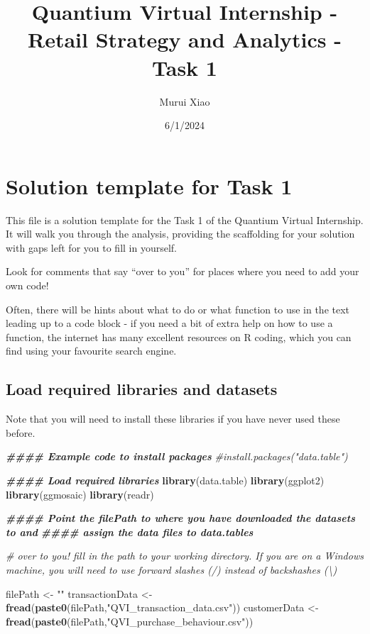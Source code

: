 \documentclass[
]{article}
\title{Quantium Virtual Internship - Retail Strategy and Analytics -
Task 1}
\author{Murui Xiao}
\date{6/1/2024}
\newenvironment{Shaded}{\begin{snugshade}}{\end{snugshade}}
\newcommand{\CommentTok}[1]{\textcolor[rgb]{0.56,0.35,0.01}{\textit{#1}}}
\newcommand{\DocumentationTok}[1]{\textcolor[rgb]{0.56,0.35,0.01}{\textbf{\textit{#1}}}}
\newcommand{\FunctionTok}[1]{\textcolor[rgb]{0.13,0.29,0.53}{\textbf{#1}}}
\newcommand{\NormalTok}[1]{#1}
\newcommand{\OtherTok}[1]{\textcolor[rgb]{0.56,0.35,0.01}{#1}}
\newcommand{\StringTok}[1]{\textcolor[rgb]{0.31,0.60,0.02}{#1}}
\begin{document}
\maketitle

\section{Solution template for Task
1}\label{solution-template-for-task-1}

This file is a solution template for the Task 1 of the Quantium Virtual
Internship. It will walk you through the analysis, providing the
scaffolding for your solution with gaps left for you to fill in
yourself.

Look for comments that say ``over to you'' for places where you need to
add your own code!

Often, there will be hints about what to do or what function to use in
the text leading up to a code block - if you need a bit of extra help on
how to use a function, the internet has many excellent resources on R
coding, which you can find using your favourite search engine.

\subsection{Load required libraries and
datasets}\label{load-required-libraries-and-datasets}

Note that you will need to install these libraries if you have never
used these before.

\begin{Shaded}
\begin{Highlighting}[]
\DocumentationTok{\#\#\#\# Example code to install packages}
\CommentTok{\#install.packages("data.table")}

\DocumentationTok{\#\#\#\# Load required libraries}
\FunctionTok{library}\NormalTok{(data.table)}
\FunctionTok{library}\NormalTok{(ggplot2)}
\FunctionTok{library}\NormalTok{(ggmosaic)}
\FunctionTok{library}\NormalTok{(readr)}

\DocumentationTok{\#\#\#\# Point the filePath to where you have downloaded the datasets to and}
\DocumentationTok{\#\#\#\# assign the data files to data.tables}

\CommentTok{\# over to you! fill in the path to your working directory. If you are on a Windows machine, you will need to use forward slashes (/) instead of backshashes (\textbackslash{})}

\NormalTok{filePath }\OtherTok{\textless{}{-}} \StringTok{""}
\NormalTok{transactionData }\OtherTok{\textless{}{-}} \FunctionTok{fread}\NormalTok{(}\FunctionTok{paste0}\NormalTok{(filePath,}\StringTok{"QVI\_transaction\_data.csv"}\NormalTok{))}
\NormalTok{customerData }\OtherTok{\textless{}{-}} \FunctionTok{fread}\NormalTok{(}\FunctionTok{paste0}\NormalTok{(filePath,}\StringTok{"QVI\_purchase\_behaviour.csv"}\NormalTok{))}
\end{Highlighting}
\end{Shaded}
\end{document}
